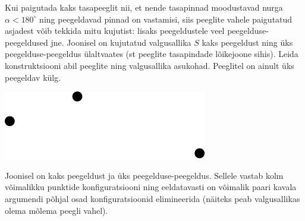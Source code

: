 
Kui paigutada kaks tasapeeglit nii, et nende tasapinnad moodustavad nurga $\alpha<180^\circ$ ning peegeldavad pinnad on vastamisi, siis peeglite vahele paigutatud asjadest võib tekkida mitu kujutist: lisaks peegeldustele veel peegelduse-peegeldused jne. Joonisel on kujutatud valgusallika $S$ kaks peegeldust ning üks peegelduse-peegeldus ülaltvaates (st peeglite tasapindade lõikejoone sihis). Leida konstruktsiooni abil peeglite ning valgusallika asukohad. Peeglitel on ainult üks peegeldav külg.\\

\begin{center}
	\includegraphics[width=0.6\linewidth]{2009-v2g-08-yl}
\end{center}

\hint
Joonisel on kaks peegeldust ja üks peegelduse-peegeldus. Sellele vastab kolm võimalikku punktide konfiguratsiooni ning eeldatavasti on võimalik paari kavala argumendi põhjal osad konfiguratsioonid elimineerida (näiteks peab valgusallikas olema mõlema peegli vahel).


